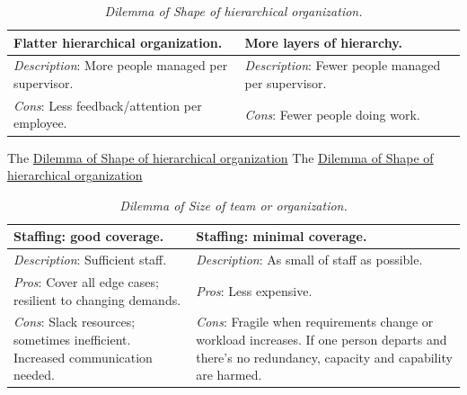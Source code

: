 \begin{center}
\begin{table}[H] %
\begin{tabular}{ | m{\dilemmatablewidth}| m{\dilemmatablewidth} | } 
  \hline
  \textbf{Flatter hierarchical organization.} &
  \textbf{More layers of hierarchy.} \\ 
  \hline
  \textit{Description}: More people managed per supervisor. & 
  \textit{Description}: Fewer people managed per supervisor. \\ 
  \hline
  \textit{Cons}: Less feedback/attention per employee. & 
  \textit{Cons}: Fewer people doing work. \\  
  \hline
\end{tabular}
\caption{
\textit{Dilemma of Shape of hierarchical organization.}
}
\label{table:people-per-supervisor}
\end{table}
\end{center}


The \href{table:people-per-supervisor}{Dilemma of Shape of hierarchical organization}
The \href{table:people-per-supervisor}{Dilemma of Shape of hierarchical organization}


\begin{center}
\begin{table}[H] %
\begin{tabular}{ | m{\dilemmatablewidth}| m{\dilemmatablewidth} | } 
  \hline
  \textbf{Staffing: good coverage.} &
  \textbf{Staffing: minimal coverage.} \\
  \hline
  \textit{Description}: Sufficient staff. &
  \textit{Description}: As small of staff as possible. \\  
  \hline
  \textit{Pros}: Cover all edge cases; resilient to changing demands. &
  \textit{Pros}: Less expensive. \\
  \hline
  \textit{Cons}: Slack resources; sometimes inefficient. Increased communication needed. & 
  \textit{Cons}: Fragile when requirements change or workload increases. If one person departs and there's no redundancy, capacity and capability are harmed.  \\
  \hline
\end{tabular}
\caption{
\textit{Dilemma of Size of team or organization.}
}
\label{table:staff_many-vs-few}
\end{table}
\end{center}



